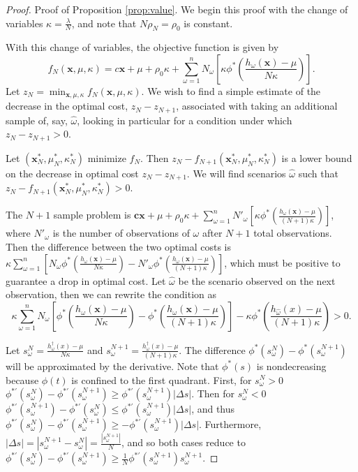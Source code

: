 \documentclass[ijoc,letterpaper]{informs3} %
\newcommand{\x}{\mathbf{x}}
\renewcommand{\c}{\mathbf{c}}
\begin{document}
\begin{proof}{\sc Proof of Proposition \ref{prop:value}.}
	We begin this proof with the change of variables $\kappa = \frac{\lambda}{N}$, and note that $N\rho_N = \rho_0$ is constant.
	
	With this change of variables, the objective function is given by
	\[
		f_N(\x,\mu,\kappa) = c\x + \mu + \rho_0 \kappa + \sum_{\omega = 1}^n N_\omega \left[ \kappa \phi^*\left(\frac{h_\omega(\x) - \mu}{N\kappa} \right) \right].
	\]
	Let $z_N = \min_{\x,\mu,\kappa} f_N(\x,\mu,\kappa)$.
	We wish to find a simple estimate of the decrease in the optimal cost, $z_N - z_{N+1}$, associated with taking an additional sample of, say, $\hat{\omega}$, looking in particular for a condition under which $z_N - z_{N+1} > 0$.
	
	Let $(\x^*_N,\mu^*_N,\kappa^*_N)$ minimize $f_N$.
	Then $z_N - f_{N+1}(\x^*_N,\mu^*_N,\kappa^*_N)$ is a lower bound on the decrease in optimal cost $z_N - z_{N+1}$.
	We will find scenarios $\hat{\omega}$ such that $z_N - f_{N+1}(\x^*_N,\mu^*_N,\kappa^*_N) > 0$.

	The $N+1$ sample problem is $\c\x + \mu + \rho_0 \kappa + \sum_{\omega = 1}^n N'_\omega \left[ \kappa \phi^*\left(\frac{h_\omega(\x) - \mu}{(N+1)\kappa} \right) \right]$,	where $N'_\omega$ is the number of observations of $\omega$ after $N+1$ total observations.
	Then the difference between the two optimal costs is $\kappa \sum_{\omega=1}^n \left[ N_\omega \phi^*\left(\frac{h_\omega(\x) - \mu}{N\kappa} \right) - N'_\omega \phi^*\left(\frac{h_\omega(\x) - \mu}{(N+1)\kappa} \right) \right]$,	which must be positive to guarantee a drop in optimal cost.
	Let $\hat{\omega}$ be the scenario observed on the next observation, then we can rewrite the condition as
	\begin{equation} \label{eq:raw_cond}
		\kappa \sum_{\omega=1}^n N_\omega \left[ \phi^*\left(\frac{h_\omega(\x) - \mu}{N\kappa} \right) - \phi^*\left(\frac{h_\omega(\x) - \mu}{(N+1)\kappa} \right) \right] - \kappa \phi^*\left(\frac{h_{\hat{\omega}}(x) - \mu}{(N+1)\kappa}\right) > 0.
	\end{equation}

	Let $s^N_\omega = \frac{h^\dagger_\omega(x) - \mu}{N\kappa}$ and $s^{N+1}_\omega = \frac{h^\dagger_\omega(x) - \mu}{(N+1)\kappa}$.
	The difference $\phi^*(s^N_\omega) - \phi^*(s^{N+1}_\omega)$ will be approximated by the derivative.
	Note that $\phi^*(s)$ is nondecreasing because $\phi(t)$ is confined to the first quadrant.
	First, for $s^N_\omega > 0$ $\phi^{*\prime}(s^N_\omega) - \phi^{*\prime}(s^{N+1}_\omega) \geq \phi^{*\prime}(s^{N+1}_\omega) |\Delta s|$.
	Then for $s^N_\omega < 0$ $\phi^{*\prime}(s^{N+1}_\omega) - \phi^{*\prime}(s^N_\omega) \leq \phi^{*\prime}(s^{N+1}_\omega) |\Delta s|$, and thus $\phi^{*\prime}(s^N_\omega) - \phi^{*\prime}(s^{N+1}_\omega) \geq -\phi^{*\prime}(s^{N+1}_\omega) |\Delta s|$.
	Furthermore, $|\Delta s| = | s^{N+1}_\omega - s^N_\omega | = \frac{|s^{N+1}_\omega|}{N}$, and so both cases reduce to $\phi^{*\prime}(s^N_\omega) - \phi^{*\prime}(s^{N+1}_\omega) \geq \frac{1}{N} \phi^{*\prime}(s^{N+1}_\omega) s^{N+1}_\omega$.


\end{proof}
\end{document}

